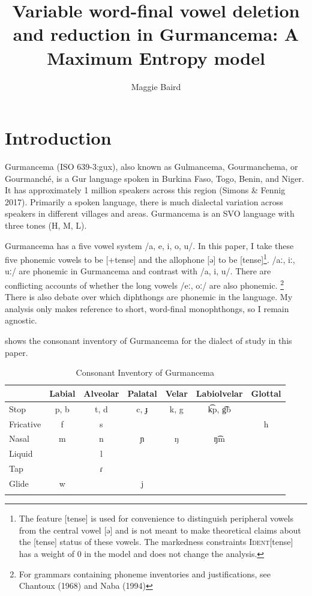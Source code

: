 \documentclass[output=paper,newtxmath,modfonts,nonflat,draftmode]{langsci/langscibook}
\title{Variable word-final vowel deletion and reduction in Gurmancema: A Maximum Entropy model}
\author{Maggie Baird\affiliation{Dartmouth College}}
\begin{document}
 

\maketitle
\section{Introduction}\label{sec:baird:1}
Gurmancema (ISO 639-3:gux), also known as Gulmancema, Gourmanchema, or Gourmanché, is a Gur language spoken in Burkina Faso, Togo, Benin, and Niger. It has approximately 1 million speakers across this region \cite{ethnologue}(Simons \& Fennig 2017). Primarily a spoken language, there is much dialectal variation across speakers in different villages and areas. Gurmancema is an SVO language with three tones (H, M, L). 

Gurmancema has a five vowel system /a, e, i, o, u/. In this paper, I take these five phonemic vowels to be [+tense] and the allophone [ə] to be [\textminus tense]\footnote{The feature [tense] is used for convenience to distinguish peripheral vowels from the central vowel [ə] and is not meant to make theoretical claims about the [tense] status of these vowels. The markedness constraints \textsc{Ident}[tense] has a weight of 0 in the model and does not change the analysis.}.  /aː, iː, uː/ are phonemic in Gurmancema and contrast with /a, i, u/. There are conflicting accounts of whether the long vowels /eː, oː/ are also phonemic. \footnote{For grammars containing phoneme inventories and justifications, see Chantoux (1968) and Naba 
(1994)}
There is also debate over which diphthongs are phonemic in the language. My 
analysis only makes reference to short, word-final monophthongs, so I remain 
agnostic.

 shows the consonant inventory of Gurmancema for the dialect of study in this paper. 

\begin{table}
\caption{Consonant Inventory of Gurmancema}
\label{tab:baird:1}
\begin{tabularx}{\textwidth}{Xcccccc}
\lsptoprule
  & Labial & Alveolar & Palatal & Velar & Labiolvelar & Glottal\\ 
 \midrule
 Stop & p, b & t, d & c, ɟ & k, g & k͡p, g͡b & \\
 Fricative & f & s &  &  &  & h\\
 Nasal & m & n & ɲ & ŋ & ŋ͡m & \\
 Liquid &  & l &  &  & & \\
 Tap &  & ɾ  &  &  &  & \\
 Glide & w & & j & &  & \\
 \lspbottomrule
 \end{tabularx}
\end{table}
\end{document}
